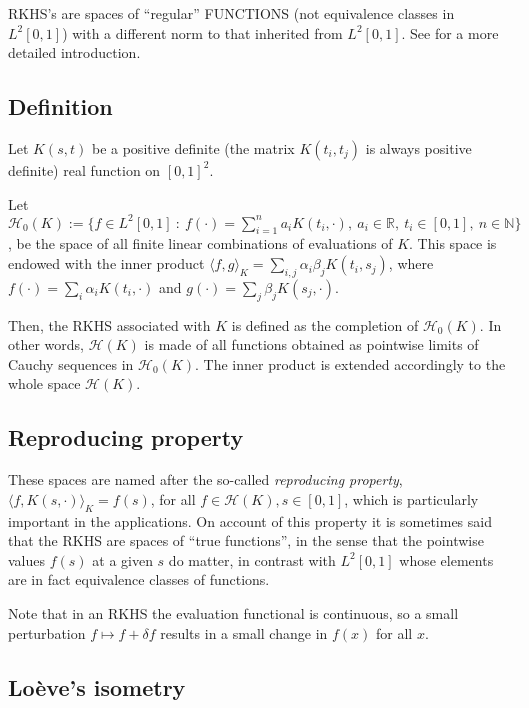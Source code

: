 
RKHS's are spaces of ``regular'' FUNCTIONS (not equivalence classes in $L^2[0,1]$) with a different norm to that inherited from $L^2[0,1]$. See  for a more detailed introduction.

\subsection*{Definition}

	Let $K(s,t)$ be a positive definite (the matrix $K(t_i,t_j)$ is always positive definite) real function on $[0,1]^2$.

	Let $\mathcal H_0(K):=\{f\in L^2[0,1] \ : \ f(\cdot)=\sum_{i=1}^n a_i K(t_i,\cdot),\ a_i\in{\mathbb R},\ t_i\in[0,1],\ n\in{\mathbb N}\}$, be
	the space of all finite linear combinations of evaluations of $K$. This space is endowed with the inner product
	$\langle f,g\rangle_K=\sum_{i,j}\alpha_i\beta_j K(t_i,s_j)$,
	where $f(\cdot)=\sum_i\alpha_i K(t_i,\cdot)$ and $g(\cdot)=\sum_j\beta_j K(s_j,\cdot)$.

	Then, the RKHS associated with $K$ is defined as the completion of $\mathcal H_0(K)$. In other words, $\mathcal H(K)$ is made of all functions obtained as pointwise limits of Cauchy sequences in $\mathcal H_0(K)$. The inner product is extended accordingly to the whole space $\mathcal H(K)$.

\subsection*{Reproducing property}

	These spaces are named after the so-called \textit{reproducing property},
	$\langle f, K(s,\cdot)\rangle_K = f(s)$, for all  $f\in\mathcal H(K), s\in[0,1]$, which is particularly important in the applications. On account of this property it is sometimes said that the RKHS are spaces of ``true functions'', in the sense that the pointwise values $f(s)$ at a given $s$ do matter, in contrast with $L^2[0,1]$ whose elements are in fact equivalence classes of functions.

  Note that in an RKHS the evaluation functional is continuous, so a small perturbation $f\mapsto f + \delta f$ results in a small change in $f(x)$ for all $x$.


\subsection*{Loève's isometry}


